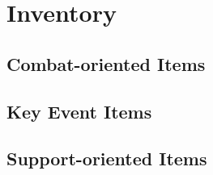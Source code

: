 \section{Inventory}
    \subsection{Combat-oriented Items}
    \subsection{Key Event Items}        
    \subsection{Support-oriented Items}